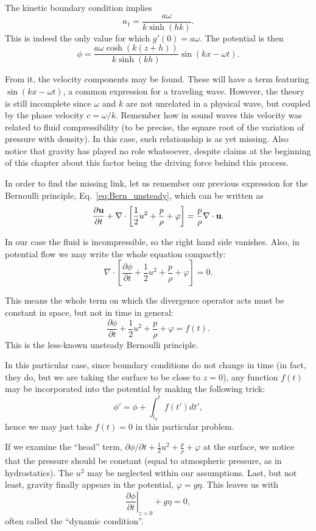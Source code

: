 The kinetic boundary condition implies
\[
a_1 = \frac{a \omega}{ k \sinh(hk)  } .
\]
This is indeed the only value for which $g'(0)= a \omega $. The
potential is then
\begin{equation}
  \label{eq:wave_potential}
  \phi = \frac{a \omega  \cosh(k(z+h)) }{ k \sinh( kh )  }  \sin(kx -\omega t ) .
\end{equation}

From it, the velocity components may be found. These will have a term
featuring $\sin(kx -\omega t )$, a common expression for a traveling
wave. However, the theory is still incomplete since $\omega$ and $k$
are not unrelated in a physical wave, but coupled by the phase
velocity $c=\omega / k$. Remember how in sound waves this velocity was
related to fluid compressibility (to be precise, the square root of
the variation of pressure with density). In this case, such
relationship is as yet missing. Also notice that gravity has played no
role whatsoever, despite claims at the beginning of this chapter about
this factor being the driving force behind this process.

In order to find the missing link, let us remember our previous
expression for the Bernoulli principle, Eq.~\ref{eq:Bern_unsteady},
which can be written as
\[
\frac{\partial \mathbf{u}}{\partial t} +
\nabla \cdot \left[
  \frac12 u^2 + \frac{p}{\rho} + \varphi
  \right] =  \frac{p}{\rho}\nabla \cdot \mathbf{u} .
\]

In our case the fluid is incompressible, so the right hand side
vanishes. Also, in potential flow we may write the whole equation
compactly:
\[
\nabla \cdot \left[
  \frac{\partial \phi}{\partial t} +
  \frac12 u^2 + \frac{p}{\rho} + \varphi
  \right] =  0 .
\]

This means the whole term on which the divergence operator acts
must be constant in space, but not in time in general:
\[
  \frac{\partial \phi}{\partial t} +
  \frac12 u^2 + \frac{p}{\rho} + \varphi =  f(t) .
\]
This is the less-known unsteady Bernoulli principle.

In this particular case, since boundary conditions do not change in
time (in fact, they do, but we are taking the surface to be close to
$z=0$), any function $f(t)$ may be incorporated into the potential
by making the following trick:
\[
\phi' = \phi + \int_{t_0}^t f(t') dt' ,
\]
hence we may just take $f(t)=0$ in this particular problem.

If we examine the ``head'' term, $ \partial \phi / \partial t +
\frac12 u^2 + \frac{p}{\rho} + \varphi$ at the surface, we notice that
the pressure should be constant (equal to atmospheric pressure, as in
hydrostatics). The $u^2$ may be neglected within our
assumptions. Last, but not least, gravity finally appears in the
potential, $\varphi = g \eta $. This leaves us with
\[
\left.\frac{\partial \phi}{\partial t}\right|_{z=0} + g \eta = 0 ,
\]
often called the ``dynamic condition''. 

